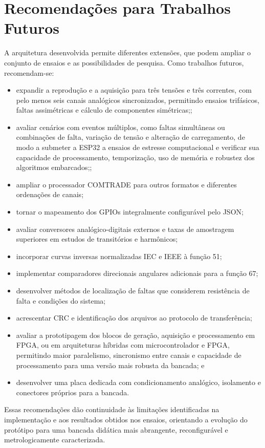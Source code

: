 \chapter{Recomendações para Trabalhos Futuros}

A arquitetura desenvolvida permite diferentes extensões, que podem ampliar o conjunto de ensaios e as possibilidades de pesquisa. Como trabalhos futuros, recomendam-se:

\begin{itemize}
  \item expandir a reprodução e a aquisição para três tensões e três correntes, com pelo menos seis canais analógicos sincronizados, permitindo ensaios trifásicos, faltas assimétricas e cálculo de componentes simétricas;;
  \item avaliar cenários com eventos múltiplos, como faltas simultâneas ou combinações de falta, variação de tensão e alteração de carregamento, de modo a submeter a ESP32 a ensaios de estresse computacional e verificar sua capacidade de processamento, temporização, uso de memória e robustez dos algoritmos embarcados;;
  \item ampliar o processador COMTRADE para outros formatos e diferentes ordenações de canais;
  \item tornar o mapeamento dos GPIOs integralmente configurável pelo JSON;
  \item avaliar conversores analógico-digitais externos e taxas de amostragem superiores em estudos de transitórios e harmônicos;
  \item incorporar curvas inversas normalizadas IEC e IEEE à função 51;
  \item implementar comparadores direcionais angulares adicionais para a função 67;
  \item desenvolver métodos de localização de faltas que considerem resistência de falta e condições do sistema;
  \item acrescentar CRC e identificação dos arquivos ao protocolo de transferência;
  \item avaliar a prototipagem dos blocos de geração, aquisição e processamento em FPGA, ou em arquiteturas híbridas com microcontrolador e FPGA, permitindo maior paralelismo, sincronismo entre canais e capacidade de processamento para uma versão mais robusta da bancada; e
  \item desenvolver uma placa dedicada com condicionamento analógico, isolamento e conectores próprios para a bancada.
\end{itemize}

Essas recomendações dão continuidade às limitações identificadas na implementação e aos resultados obtidos nos ensaios, orientando a evolução do protótipo para uma bancada didática mais abrangente, reconfigurável e metrologicamente caracterizada.
